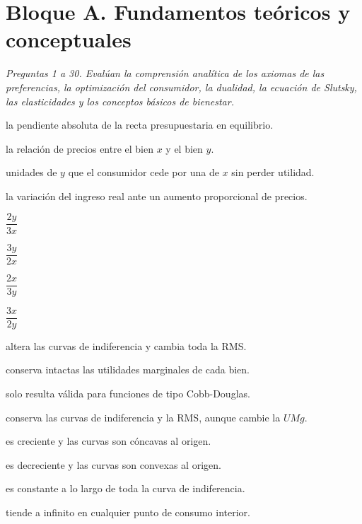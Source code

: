 \section*{Bloque A. Fundamentos teóricos y conceptuales}

\noindent\textit{Preguntas 1 a 30. Evalúan la comprensión analítica de los axiomas de las preferencias, la optimización del consumidor, la dualidad, la ecuación de Slutsky, las elasticidades y los conceptos básicos de bienestar.}

\begin{opts}
    \item la pendiente absoluta de la recta presupuestaria en equilibrio.
    \item la relación de precios entre el bien $x$ y el bien $y$.
    \item unidades de $y$ que el consumidor cede por una de $x$ sin perder utilidad.
    \item la variación del ingreso real ante un aumento proporcional de precios.
\end{opts}

\begin{opts}
    \item $\dfrac{2y}{3x}$
    \item $\dfrac{3y}{2x}$
    \item $\dfrac{2x}{3y}$
    \item $\dfrac{3x}{2y}$
\end{opts}

\begin{opts}
    \item altera las curvas de indiferencia y cambia toda la RMS.
    \item conserva intactas las utilidades marginales de cada bien.
    \item solo resulta válida para funciones de tipo Cobb-Douglas.
    \item conserva las curvas de indiferencia y la RMS, aunque cambie la $UMg$.
\end{opts}

\begin{opts}
    \item es creciente y las curvas son cóncavas al origen.
    \item es decreciente y las curvas son convexas al origen.
    \item es constante a lo largo de toda la curva de indiferencia.
    \item tiende a infinito en cualquier punto de consumo interior.
\end{opts}

